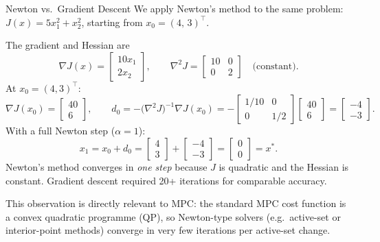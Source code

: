 \begin{examplebox}{Newton vs.\ Gradient Descent}
	We apply Newton's method to the same problem: $J(x)=5x_1^2+x_2^2$, starting from $x_0=(4,\,3)^\top$.

	\solution

	The gradient and Hessian are
	\[
	\nabla J(x) = \begin{bmatrix} 10x_1 \\ 2x_2 \end{bmatrix}, \qquad
	\nabla^2 J = \begin{bmatrix} 10 & 0 \\ 0 & 2 \end{bmatrix} \quad \text{(constant)}.
	\]
	At $x_0=(4,3)^\top$:
	\[
	\nabla J(x_0) = \begin{bmatrix} 40 \\ 6 \end{bmatrix}, \qquad
	d_0 = -\bigl(\nabla^2 J\bigr)^{-1}\nabla J(x_0)
	= -\begin{bmatrix} 1/10 & 0 \\ 0 & 1/2 \end{bmatrix}
	\begin{bmatrix} 40 \\ 6 \end{bmatrix}
	= \begin{bmatrix} -4 \\ -3 \end{bmatrix}.
	\]
	With a full Newton step ($\alpha=1$):
	\[
	x_1 = x_0 + d_0 = \begin{bmatrix} 4 \\ 3 \end{bmatrix} + \begin{bmatrix} -4 \\ -3 \end{bmatrix} = \begin{bmatrix} 0 \\ 0 \end{bmatrix} = x^*.
	\]
	Newton's method converges in \emph{one step} because $J$ is quadratic and the Hessian is constant. Gradient descent required 20+ iterations for comparable accuracy.

	This observation is directly relevant to MPC: the standard MPC cost function is a convex quadratic programme (QP), so Newton-type solvers (e.g.\ active-set or interior-point methods) converge in very few iterations per active-set change.
\end{examplebox}

